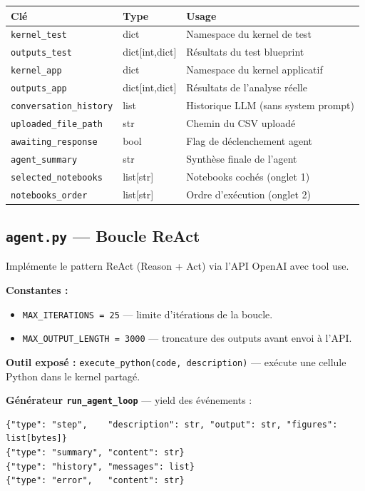 \documentclass[11pt,a4paper]{article}
\begin{document}
\begin{center}
\begin{tabular}{lll}
\toprule
\textbf{Clé} & \textbf{Type} & \textbf{Usage} \\
\midrule
\texttt{kernel\_test} & dict & Namespace du kernel de test \\
\texttt{outputs\_test} & dict[int,dict] & Résultats du test blueprint \\
\texttt{kernel\_app} & dict & Namespace du kernel applicatif \\
\texttt{outputs\_app} & dict[int,dict] & Résultats de l'analyse réelle \\
\texttt{conversation\_history} & list & Historique LLM (sans system prompt) \\
\texttt{uploaded\_file\_path} & str & Chemin du CSV uploadé \\
\texttt{awaiting\_response} & bool & Flag de déclenchement agent \\
\texttt{agent\_summary} & str & Synthèse finale de l'agent \\
\texttt{selected\_notebooks} & list[str] & Notebooks cochés (onglet 1) \\
\texttt{notebooks\_order} & list[str] & Ordre d'exécution (onglet 2) \\
\bottomrule
\end{tabular}
\end{center}

\subsection{\texttt{agent.py} — Boucle ReAct}

Implémente le pattern ReAct (Reason + Act) via l'API OpenAI avec tool use.

\textbf{Constantes :}
\begin{itemize}
  \item \texttt{MAX\_ITERATIONS = 25} — limite d'itérations de la boucle.
  \item \texttt{MAX\_OUTPUT\_LENGTH = 3000} — troncature des outputs avant envoi à l'API.
\end{itemize}

\textbf{Outil exposé :} \texttt{execute\_python(code, description)} — exécute une cellule
Python dans le kernel partagé.

\textbf{Générateur \texttt{run\_agent\_loop}} — yield des événements :
\begin{lstlisting}
{"type": "step",    "description": str, "output": str, "figures": list[bytes]}
{"type": "summary", "content": str}
{"type": "history", "messages": list}
{"type": "error",   "content": str}
\end{lstlisting}
\end{document}
